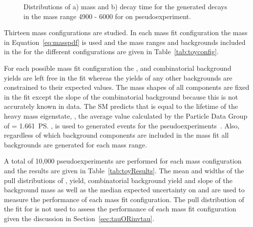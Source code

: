 {\begin{figure}[htbp]
    \caption{Distributions of a) mass and b) decay time for the generated decays in the mass range 4900 - 6000 for on pseudoexperiment.}
    \label{fig:toygen}
\end{figure}




Thirteen mass configurations are studied. In each mass fit configuration the mass \pdf in Equation~\ref{eq:masspdf} is used and the mass ranges and backgrounds included in the \pdf for the different configurations are given in Table~\ref{tab:toyconfig}.


For each possible mass fit configuration the \bsmumu, \bdmumu and combinatorial background yields are left free in the fit whereas the yields of any other backgrounds are constrained to their expected values. The mass shapes of all components are fixed in the \ml fit except the slope of the combinatorial background because this is not accurately known in data. 
The SM predicts that \tmumu is equal to the lifetime of the heavy \bs mass eigenstate, \tH, the average value calculated by the Particle Data Group of \tmumu = 1.661~\ps, is used to generated events for the pseudoexperiments~\cite{Olive:2016xmw}. %
Also, regardless of which background components are included in the mass fit all backgrounds are generated for each mass range. %

A total of 10,000 pseudoexperiments are performed for each mass configuration and the results are given in Table~\ref{tab:toyResults}. The mean and widths of the pull distributions of \Gmumu, \bsmumu yield, combinatorial background yield and slope of the background mass \pdf as well as the median expected uncertainty on \tmumu and \Gmumu are used to measure the performance of each mass fit configuration. The pull distribution of the fit for \tmumu is not used to assess the performance of each mass fit configuration given the discussion in Section~\ref{sec:tauORinvtau}.



}
